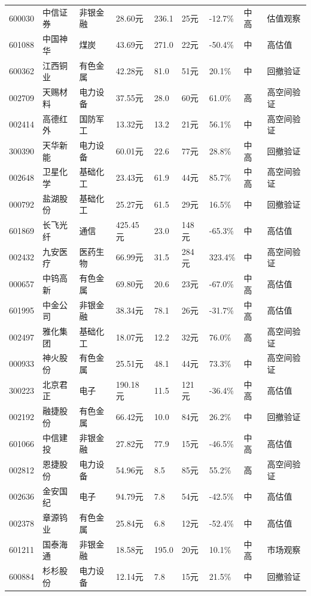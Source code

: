 \begin{longtable}{L{1.05cm}L{1.55cm}L{1.55cm}R{0.85cm}R{0.85cm}R{0.85cm}R{0.85cm}R{0.65cm}L{2.65cm}}
600030 & 中信证券 & 非银金融 & 28.60元 & 236.1 & 25元 & -12.7\% & 中高 & 估值观察 \\
601088 & 中国神华 & 煤炭 & 43.69元 & 271.0 & 22元 & -50.4\% & 中 & 高估值 \\
600362 & 江西铜业 & 有色金属 & 42.28元 & 81.0 & 51元 & 20.1\% & 中 & 回撤验证 \\
002709 & 天赐材料 & 电力设备 & 37.55元 & 28.0 & 60元 & 61.0\% & 高 & 高空间验证 \\
002414 & 高德红外 & 国防军工 & 13.32元 & 13.2 & 21元 & 56.1\% & 中 & 高空间验证 \\
300390 & 天华新能 & 电力设备 & 60.01元 & 22.6 & 77元 & 28.8\% & 中高 & 回撤验证 \\
002648 & 卫星化学 & 基础化工 & 23.43元 & 61.9 & 44元 & 85.7\% & 中高 & 高空间验证 \\
000792 & 盐湖股份 & 基础化工 & 25.27元 & 61.5 & 29元 & 16.5\% & 中 & 回撤验证 \\
601869 & 长飞光纤 & 通信 & 425.45元 & 23.0 & 148元 & -65.3\% & 中 & 高估值 \\
002432 & 九安医疗 & 医药生物 & 66.99元 & 31.5 & 284元 & 323.4\% & 中 & 高空间验证 \\
000657 & 中钨高新 & 有色金属 & 69.80元 & 20.6 & 23元 & -67.0\% & 中高 & 高估值 \\
601995 & 中金公司 & 非银金融 & 38.34元 & 78.1 & 26元 & -31.7\% & 中高 & 高估值 \\
002497 & 雅化集团 & 基础化工 & 18.07元 & 12.2 & 32元 & 76.0\% & 高 & 高空间验证 \\
000933 & 神火股份 & 有色金属 & 25.51元 & 48.1 & 44元 & 73.3\% & 中 & 高空间验证 \\
300223 & 北京君正 & 电子 & 190.18元 & 11.5 & 121元 & -36.4\% & 中高 & 高估值 \\
002192 & 融捷股份 & 有色金属 & 66.42元 & 10.0 & 84元 & 26.2\% & 中 & 回撤验证 \\
601066 & 中信建投 & 非银金融 & 27.82元 & 77.9 & 15元 & -46.5\% & 中高 & 高估值 \\
002812 & 恩捷股份 & 电力设备 & 54.96元 & 8.5 & 85元 & 55.2\% & 高 & 高空间验证 \\
002636 & 金安国纪 & 电子 & 94.79元 & 7.8 & 54元 & -42.5\% & 中 & 高估值 \\
002378 & 章源钨业 & 有色金属 & 25.84元 & 6.8 & 12元 & -52.4\% & 中 & 高估值 \\
601211 & 国泰海通 & 非银金融 & 18.58元 & 195.0 & 20元 & 10.1\% & 中高 & 市场观察 \\
600884 & 杉杉股份 & 电力设备 & 12.14元 & 7.8 & 15元 & 21.5\% & 中 & 回撤验证 \\

\end{longtable}
